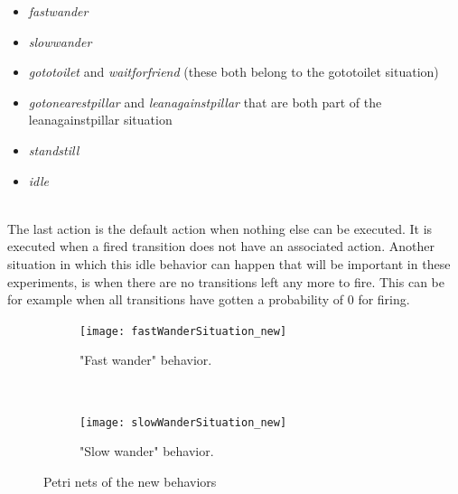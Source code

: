 \documentclass[11pt, a4paper]{book}
\begin{document}
\begin{minipage}{\textwidth}
\begin{itemize}
\item \emph{fastwander}
\item \emph{slowwander}
\item \emph{gototoilet} and \emph{waitforfriend} (these both belong to the gototoilet situation)
\item \emph{gotonearestpillar} and \emph{leanagainstpillar} that are both part of the leanagainstpillar situation 
\item \emph{standstill}
\item \emph{idle}\\
\end{itemize}
\end{minipage}\\
The last action is the default action when nothing else can be executed. It is executed when a fired transition does not have an associated action. Another situation in which this idle behavior can happen that will be important in these experiments, is when there are no transitions left any more to fire. This can be for example when all transitions have gotten a probability of 0 for firing.


\begin{figure}
        \centering
        \begin{subfigure}[b]{0.5\textwidth}
                \texttt{[image: fastWanderSituation\_new]}
                \caption{"Fast wander" behavior.}
                \label{fig:fastWanderPetrinet}
        \end{subfigure}%
        ~ %
        \begin{subfigure}[b]{0.5\textwidth}
                \texttt{[image: slowWanderSituation\_new]}
                \caption{"Slow wander" behavior.}
                \label{fig:slowWanderPetrinet}
        \end{subfigure}
        \caption{Petri nets of the new behaviors}\label{fig:newSituations}
\end{figure}
\end{document}
